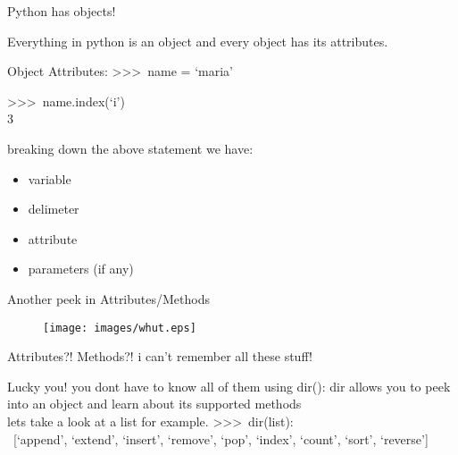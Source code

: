 \documentclass{beamer}
\begin{document}
  \begin{frame}{Python has objects!}
    
    Everything in python is an object and every object has its attributes.

    \begin{block}{Object Attributes:}
      \scriptsize
      \textgreater\textgreater\textgreater \ name = `maria'
      
      \textgreater\textgreater\textgreater \ name.index(`i')\\
        3
      
      breaking down the above statement we have:
        \begin{itemize}
          \item variable
          \item delimeter
          \item attribute
          \item parameters (if any)
        \end{itemize}
    \end{block}

  \end{frame}

  \begin{frame}{Another peek in Attributes/Methods}

    \begin{figure}
      \texttt{[image: images/whut.eps]}
    \end{figure}

    Attributes?! Methods?! i can't remember all these stuff!

    \begin{block}{Lucky you! you dont have to know all of them}
      \scriptsize
      using dir():
      dir allows you to peek into an object and learn about its supported methods\\
      lets take a look at a list for example.
      \textgreater\textgreater\textgreater \ dir(list):\\ \
      [`append', `extend', `insert', `remove', `pop', `index', `count', `sort', `reverse']
    \end{block}
  
  \end{frame}
\end{document}

